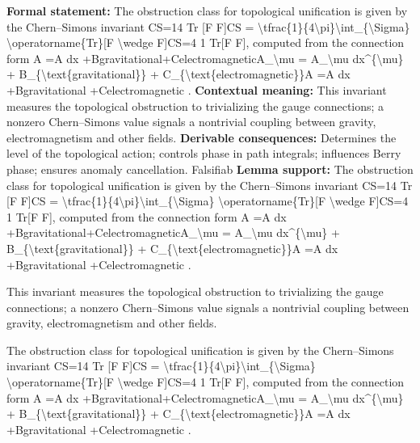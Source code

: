 \begingroup\footnotesize\setlength{\emergencystretch}{3em}\sloppy
\textbf{Formal statement:} The obstruction class for topological unification is given by the Chern--Simons invariant CS=14   Tr [F F]CS = \textbackslash{}tfrac\{1\}\{4\textbackslash{}pi\}\textbackslash{}int\_\{\textbackslash{}Sigma\} \textbackslash{}operatorname\{Tr\}[F \textbackslash{}wedge F]CS=4 1    Tr[F F], computed from the connection form A =A dx +Bgravitational+CelectromagneticA\_\textbackslash{}mu = A\_\textbackslash{}mu dx\textasciicircum{}\{\textbackslash{}mu\} + B\_\{\textbackslash{}text\{gravitational\}\} + C\_\{\textbackslash{}text\{electromagnetic\}\}A  =A  dx +Bgravitational +Celectromagnetic .
\textbf{Contextual meaning:} This invariant measures the topological obstruction to trivializing the gauge connections; a nonzero Chern--Simons value signals a nontrivial coupling between gravity, electromagnetism and other fields.
\textbf{Derivable consequences:} Determines the level of the topological action; controls phase in path integrals; influences Berry phase; ensures anomaly cancellation. Falsifiab
\textbf{Lemma support:} The obstruction class for topological unification is given by the Chern--Simons invariant CS=14   Tr [F F]CS = \textbackslash{}tfrac\{1\}\{4\textbackslash{}pi\}\textbackslash{}int\_\{\textbackslash{}Sigma\} \textbackslash{}operatorname\{Tr\}[F \textbackslash{}wedge F]CS=4 1    Tr[F F], computed from the connection form A =A dx +Bgravitational+CelectromagneticA\_\textbackslash{}mu = A\_\textbackslash{}mu dx\textasciicircum{}\{\textbackslash{}mu\} + B\_\{\textbackslash{}text\{gravitational\}\} + C\_\{\textbackslash{}text\{electromagnetic\}\}A  =A  dx +Bgravitational +Celectromagnetic .\par
\endgroup

This invariant measures the topological obstruction to trivializing the gauge connections; a nonzero Chern--Simons value signals a nontrivial coupling between gravity, electromagnetism and other fields.

The obstruction class for topological unification is given by the Chern--Simons invariant CS=14   Tr [F F]CS = \textbackslash{}tfrac\{1\}\{4\textbackslash{}pi\}\textbackslash{}int\_\{\textbackslash{}Sigma\} \textbackslash{}operatorname\{Tr\}[F \textbackslash{}wedge F]CS=4 1    Tr[F F], computed from the connection form A =A dx +Bgravitational+CelectromagneticA\_\textbackslash{}mu = A\_\textbackslash{}mu dx\textasciicircum{}\{\textbackslash{}mu\} + B\_\{\textbackslash{}text\{gravitational\}\} + C\_\{\textbackslash{}text\{electromagnetic\}\}A  =A  dx +Bgravitational +Celectromagnetic .

